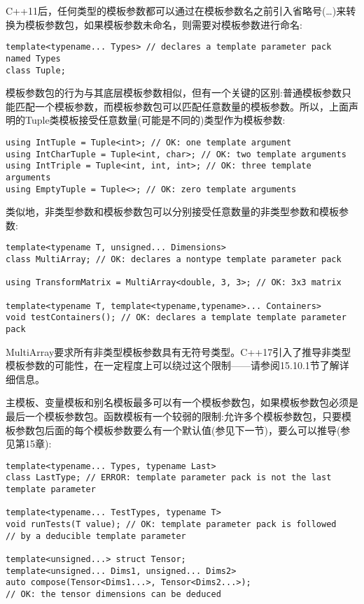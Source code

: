 
C++11后，任何类型的模板参数都可以通过在模板参数名之前引入省略号(…)来转换为模板参数包，如果模板参数未命名，则需要对模板参数进行命名:

\begin{lstlisting}[style=styleCXX]
template<typename... Types> // declares a template parameter pack named Types
class Tuple;
\end{lstlisting}

模板参数包的行为与其底层模板参数相似，但有一个关键的区别:普通模板参数只能匹配一个模板参数，而模板参数包可以匹配任意数量的模板参数。所以，上面声明的Tuple类模板接受任意数量(可能是不同的)类型作为模板参数:

\begin{lstlisting}[style=styleCXX]
using IntTuple = Tuple<int>; // OK: one template argument
using IntCharTuple = Tuple<int, char>; // OK: two template arguments
using IntTriple = Tuple<int, int, int>; // OK: three template arguments
using EmptyTuple = Tuple<>; // OK: zero template arguments
\end{lstlisting}

类似地，非类型参数和模板参数包可以分别接受任意数量的非类型参数和模板参数:

\begin{lstlisting}[style=styleCXX]
template<typename T, unsigned... Dimensions>
class MultiArray; // OK: declares a nontype template parameter pack

using TransformMatrix = MultiArray<double, 3, 3>; // OK: 3x3 matrix

template<typename T, template<typename,typename>... Containers>
void testContainers(); // OK: declares a template template parameter pack
\end{lstlisting}

MultiArray要求所有非类型模板参数具有无符号类型。C++17引入了推导非类型模板参数的可能性，在一定程度上可以绕过这个限制——请参阅15.10.1节了解详细信息。

主模板、变量模板和别名模板最多可以有一个模板参数包，如果模板参数包必须是最后一个模板参数包。函数模板有一个较弱的限制:允许多个模板参数包，只要模板参数包后面的每个模板参数要么有一个默认值(参见下一节)，要么可以推导(参见第15章):

\begin{lstlisting}[style=styleCXX]
template<typename... Types, typename Last>
class LastType; // ERROR: template parameter pack is not the last template parameter

template<typename... TestTypes, typename T>
void runTests(T value); // OK: template parameter pack is followed
// by a deducible template parameter

template<unsigned...> struct Tensor;
template<unsigned... Dims1, unsigned... Dims2>
auto compose(Tensor<Dims1...>, Tensor<Dims2...>);
// OK: the tensor dimensions can be deduced
\end{lstlisting}


